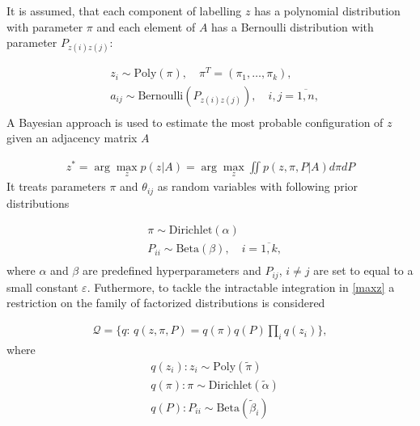 
It is assumed, that each component of labelling $z$ has a polynomial distribution with parameter $\pi$
and each element of $A$ has a Bernoulli distribution with parameter $P_{z(i)z(j)}$:

\begin{equation}
    \begin{aligned}
    \nonumber
        & z_i \sim \text{Poly}(\pi), \quad \pi^T = (\pi_{1}, \dots, \pi_{k}), \\
        & a_{ij} \sim \text{Bernoulli}(P_{z(i)z(j)}), \quad i,j = \overline{1, n}, \\
    \end{aligned}
\end{equation}
A Bayesian approach is used to estimate the most probable configuration of $z$ given an adjacency matrix $A$

\begin{equation}
    \begin{aligned}
    \label{maxz}
    z^* = \arg\max\limits_z p(z | A) = \arg\max\limits_z \iint p(z, \pi, P | A) d\pi dP
    \end{aligned}
\end{equation}
It treats parameters $\pi$ and $\theta_{ij}$ as random variables with following prior distributions

\begin{equation}
    \begin{aligned}
    \nonumber
        & \pi \sim \text{Dirichlet}(\alpha) \\
        & P_{ii} \sim \text{Beta}(\beta), \quad i = \overline{1,k}, \\
    \end{aligned}
\end{equation}
where $\alpha$ and $\beta$ are predefined hyperparameters
and $P_{ij}$, $i\neq j$ are set to equal to a small constant $\varepsilon$.
Futhermore, to tackle the intractable integration in \ref{maxz} a restriction on the family of factorized distributions is considered

\begin{equation}
    \begin{aligned}
    \nonumber
    \mathcal Q = \{q:\, q(z, \pi, P) = q(\pi)q(P) \prod\limits_i q(z_i) \},
    \end{aligned}
\end{equation}
where
\begin{equation}
    \begin{aligned}
    \nonumber
    & q(z_i): z_i \sim \text{Poly}(\tilde \pi) \\
    & q(\pi): \pi \sim \text{Dirichlet}(\tilde \alpha) \\
    & q(P): P_{ii} \sim \text{Beta}(\tilde\beta_i)
    \end{aligned}
\end{equation}

